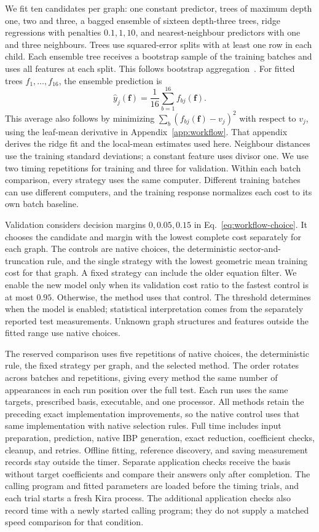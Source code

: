 We fit ten candidates per graph: one constant predictor, trees of maximum
depth one, two and three, a bagged ensemble of sixteen depth-three trees,
ridge regressions with penalties $0.1,1,10$, and nearest-neighbour
predictors with one and three neighbours. Trees use squared-error splits
with at least one row in each child. Each ensemble tree receives a
bootstrap sample of the training batches and uses all features at each
split. This follows bootstrap aggregation~\cite{Breiman1996Bagging}.
For fitted trees $f_1,\ldots,f_{16}$, the ensemble prediction is
\begin{equation}
 \widehat y_j(\boldsymbol f)=\frac1{16}
 \sum_{b=1}^{16}f_{bj}(\boldsymbol f).
\end{equation}
This average also follows by minimizing
$\sum_b(f_{bj}(\boldsymbol f)-v_j)^2$ with respect to $v_j$, using the
leaf-mean derivative in Appendix~\ref{app:workflow}. That appendix derives
the ridge fit and the local-mean estimates used here. Neighbour distances
use the training standard deviations; a constant feature uses divisor
one. We use two timing repetitions for training and three for validation.
Within each batch comparison, every strategy uses the same computer.
Different training batches can use different computers, and the
training response normalizes each cost to its own batch baseline.

Validation considers decision margins $0,0.05,0.15$ in
Eq.~\eqref{eq:workflow-choice}. It chooses the candidate and margin with
the lowest complete cost separately for each graph. The controls are
native choices, the deterministic sector-and-truncation rule, and the
single strategy with the lowest geometric mean training cost for that
graph. A fixed strategy can include the older equation filter. We enable
the new model only when its validation cost ratio to the fastest control
is at most $0.95$. Otherwise, the method uses that control. The threshold determines when the model is enabled; statistical interpretation comes from the separately reported test measurements. Unknown graph structures
and features outside the fitted range use native choices.

The reserved comparison uses five repetitions of native choices, the
deterministic rule, the fixed strategy per graph, and the selected method.
The order rotates across batches and repetitions, giving every method
the same number of appearances in each run position over the full test.
Each run uses the same targets, prescribed basis, executable, and one
processor. All methods retain the preceding exact implementation
improvements, so the native control uses that same implementation with
native selection rules. Full time includes input preparation, prediction, native IBP
generation, exact reduction, coefficient checks, cleanup, and retries.
Offline fitting, reference discovery, and saving measurement records stay
outside the timer. Separate application checks receive the basis without
target coefficients and compare their answers only after completion.
The calling program and fitted parameters are loaded before the timing
trials, and each trial starts a fresh Kira process. The additional
application checks also record time with a newly started calling program;
they do not supply a matched speed comparison for that condition.

